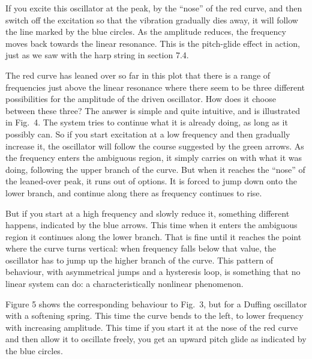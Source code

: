   If you excite this oscillator at the peak, by the ``nose'' of the red curve, 
  and then switch off the excitation so that the vibration gradually dies away, 
  it will follow the line marked by the blue circles. As the amplitude reduces, 
  the frequency moves back towards the linear resonance. This is the 
  pitch-glide effect in action, just as we saw with the harp string in section 
  7.4. 

  The red curve has leaned over so far in this plot that there is a range of 
  frequencies just above the linear resonance where there seem to be three 
  different possibilities for the amplitude of the driven oscillator. How does 
  it choose between these three? The answer is simple and quite intuitive, and 
  is illustrated in Fig.\ 4. The system tries to continue what it is already 
  doing, as long as it possibly can. So if you start excitation at a low 
  frequency and then gradually increase it, the oscillator will follow the 
  course suggested by the green arrows. As the frequency enters the ambiguous 
  region, it simply carries on with what it was doing, following the upper 
  branch of the curve. But when it reaches the ``nose'' of the leaned-over 
  peak, it runs out of options. It is forced to jump down onto the lower 
  branch, and continue along there as frequency continues to rise. 


  But if you start at a high frequency and slowly reduce it, something 
  different happens, indicated by the blue arrows. This time when it enters the 
  ambiguous region it continues along the lower branch. That is fine until it 
  reaches the point where the curve turns vertical: when frequency falls below 
  that value, the oscillator has to jump up the higher branch of the curve. 
  This pattern of behaviour, with asymmetrical jumps and a hysteresis loop, is 
  something that no linear system can do: a characteristically nonlinear 
  phenomenon. 

  Figure 5 shows the corresponding behaviour to Fig.\ 3, but for a Duffing 
  oscillator with a softening spring. This time the curve bends to the left, to 
  lower frequency with increasing amplitude. This time if you start it at the 
  nose of the red curve and then allow it to oscillate freely, you get an 
  upward pitch glide as indicated by the blue circles. 

